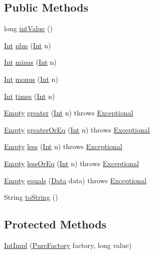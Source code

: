 \subsection*{Public Methods}
\begin{CompactItemize}
\item 
long \hyperlink{classIntImpl_a0}{int\-Value} ()
\item 
\hyperlink{interfaceInt}{Int} \hyperlink{classIntImpl_a1}{plus} (\hyperlink{interfaceInt}{Int} n)
\item 
\hyperlink{interfaceInt}{Int} \hyperlink{classIntImpl_a2}{minus} (\hyperlink{interfaceInt}{Int} n)
\item 
\hyperlink{interfaceInt}{Int} \hyperlink{classIntImpl_a3}{monus} (\hyperlink{interfaceInt}{Int} n)
\item 
\hyperlink{interfaceInt}{Int} \hyperlink{classIntImpl_a4}{times} (\hyperlink{interfaceInt}{Int} n)
\item 
\hyperlink{interfaceEmpty}{Empty} \hyperlink{classIntImpl_a5}{greater} (\hyperlink{interfaceInt}{Int} n) throws \hyperlink{classExceptional}{Exceptional}
\item 
\hyperlink{interfaceEmpty}{Empty} \hyperlink{classIntImpl_a6}{greater\-Or\-Eq} (\hyperlink{interfaceInt}{Int} n) throws \hyperlink{classExceptional}{Exceptional}
\item 
\hyperlink{interfaceEmpty}{Empty} \hyperlink{classIntImpl_a7}{less} (\hyperlink{interfaceInt}{Int} n) throws \hyperlink{classExceptional}{Exceptional}
\item 
\hyperlink{interfaceEmpty}{Empty} \hyperlink{classIntImpl_a8}{less\-Or\-Eq} (\hyperlink{interfaceInt}{Int} n) throws \hyperlink{classExceptional}{Exceptional}
\item 
\hyperlink{interfaceEmpty}{Empty} \hyperlink{classIntImpl_a9}{equals} (\hyperlink{interfaceData}{Data} data) throws \hyperlink{classExceptional}{Exceptional}
\item 
String \hyperlink{classIntImpl_a10}{to\-String} ()
\end{CompactItemize}
\subsection*{Protected Methods}
\begin{CompactItemize}
\item 
\hyperlink{classIntImpl_b0}{Int\-Impl} (\hyperlink{classPureFactory}{Pure\-Factory} factory, long value)
\end{CompactItemize}


